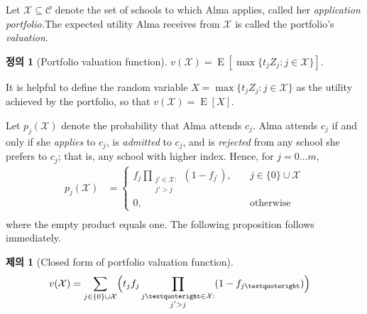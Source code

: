\documentclass[12pt]{article} %
\newtheorem{proposition}{Proposition}
\theoremstyle{definition}
\newtheorem{definition}{Definition}
\newtheorem{proposition}{제의}
\theoremstyle{definition}
\newtheorem{definition}{정의}
\begin{document}
Let $\mathcal{X} \subseteq \mathcal{C}$ denote the set of schools to which Alma applies, called her \emph{application portfolio.}The expected utility Alma receives from $\mathcal{X}$ is called the portfolio’s \emph{valuation}. %
\begin{definition}[Portfolio valuation function]
$v(\mathcal{X}) = \operatorname{E}\left[ \max\{t_j Z_j : j \in \mathcal{X}\} \right]$.
\end{definition}
It is helpful to define the random variable $X  = \max\{ t_j Z_j : j \in \mathcal{X}\}$ as the utility achieved by the portfolio, so that $v(\mathcal{X}) = \operatorname{E}[X]$.

Let $p_j(\mathcal{X})$ denote the probability that Alma attends $c_j$. Alma attends $c_j$ if and only if she \emph{applies} to $c_j$, is \emph{admitted} to $c_j$, and is \emph{rejected} from any school she prefers to $c_j$; that is, any school with higher index. Hence, for $j= 0\dots m$,
\begin{align}
p_j(\mathcal{X}) &= 
\begin{cases}
\displaystyle f_j  \prod_{\substack{j’ \in \mathcal{X}: \\ j' > j}} (1 - f_{j’}), \quad & j \in \{0\}\cup\mathcal{X}\\
0, \quad & \text{otherwise}
\end{cases} \\
\end{align}
where the empty product equals one. The following proposition follows immediately.

\begin{proposition}[Closed form of portfolio valuation function]
\begin{align}
v(\mathcal{X}) &= \sum_{j\in\{0\}\cup\mathcal{X}} \Bigl( t_j f_j  \prod_{\substack{j’ \in \mathcal{X}: \\ j' > j}} (1 - f_{j’}) \Bigr)  \label{closedformportfoliovaluationX}%
\end{align}
\end{proposition}
\end{document}
